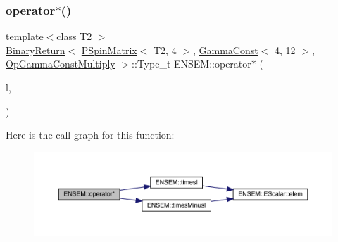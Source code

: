 \subsubsection{\texorpdfstring{operator$\ast$()}{operator*()}\hspace{0.1cm}{\footnotesize\ttfamily [29/64]}}
{\footnotesize\ttfamily template$<$class T2 $>$ \\
\mbox{\hyperlink{structENSEM_1_1BinaryReturn}{Binary\+Return}}$<$ \mbox{\hyperlink{classENSEM_1_1PSpinMatrix}{P\+Spin\+Matrix}}$<$ T2, 4 $>$, \mbox{\hyperlink{classENSEM_1_1GammaConst}{Gamma\+Const}}$<$ 4, 12 $>$, \mbox{\hyperlink{structENSEM_1_1OpGammaConstMultiply}{Op\+Gamma\+Const\+Multiply}} $>$\+::Type\+\_\+t E\+N\+S\+E\+M\+::operator$\ast$ (\begin{DoxyParamCaption}\item[{const \mbox{\hyperlink{classENSEM_1_1PSpinMatrix}{P\+Spin\+Matrix}}$<$ T2, 4 $>$ \&}]{l,  }\item[{const \mbox{\hyperlink{classENSEM_1_1GammaConst}{Gamma\+Const}}$<$ 4, 12 $>$ \&}]{ }\end{DoxyParamCaption})\hspace{0.3cm}{\ttfamily [inline]}}

Here is the call graph for this function\+:\nopagebreak
\begin{figure}[H]
\begin{center}
\leavevmode
\includegraphics[width=350pt]{d6/df5/group__primspinmatrix_ga8c42140341467357377e412313e01a3c_cgraph}
\end{center}
\end{figure}
\mbox{\label{group__primspinmatrix_ga144197a9be57f3b174a39c02a6c5e03f}} 
